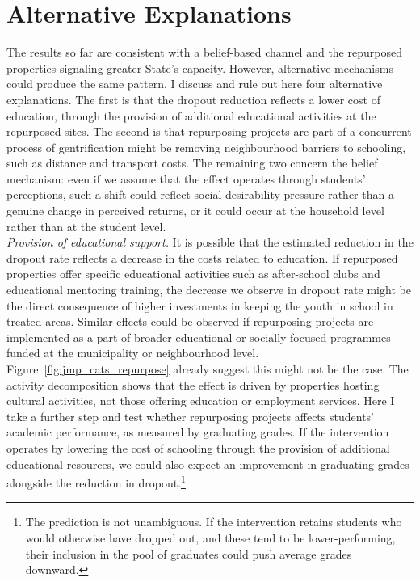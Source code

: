 \documentclass[12pt]{article}
\theoremstyle{plain}
\theoremstyle{plain}
\theoremstyle{plain}
\theoremstyle{definition}
\theoremstyle{plain}
\theoremstyle{definition}
\theoremstyle{plain}
\theoremstyle{remark}
\theoremstyle{definition}
\theoremstyle{definition}
\theoremstyle{plain}
\begin{document}
\section{Alternative Explanations}
\label{sec:jmp_altexpl}
The results so far are consistent with a belief-based channel and the repurposed properties signaling greater State's capacity. However, alternative mechanisms could produce the same pattern. I discuss and rule out here four alternative explanations. The first is that the dropout reduction reflects a lower cost of education, through the provision of additional educational activities at the repurposed sites. The second is that repurposing projects are part of a concurrent process of gentrification might be removing neighbourhood barriers to schooling, such as distance and transport costs. The remaining two concern the belief mechanism: even if we assume that the effect operates through students' perceptions, such a shift could reflect social-desirability pressure rather than a genuine change in perceived returns, or it could occur at the household level rather than at the student level. \\
\emph{Provision of educational support.} It is possible that the estimated reduction in the dropout rate reflects a decrease in the costs related to education. If repurposed properties offer specific educational activities such as after-school clubs and educational mentoring training, the decrease we observe in dropout rate might be the direct consequence of higher investments in keeping the youth in school in treated areas. Similar effects could be observed if repurposing projects are implemented as a part of broader educational or socially-focused programmes funded at the municipality or neighbourhood level. Figure~\ref{fig:jmp_cats_repurpose} already suggest this might not be the case. The activity decomposition shows that the effect is driven by properties hosting cultural activities, not those offering education or employment services. Here I take a further step and test whether repurposing projects affects students' academic performance, as measured by graduating grades. If the intervention operates by lowering the cost of schooling through the provision of additional educational resources, we could also expect an improvement in graduating grades alongside the reduction in dropout.\footnote{The prediction is not unambiguous. If the intervention retains students who would otherwise have dropped out, and these tend to be lower-performing, their inclusion in the pool of graduates could push average grades downward.} 
\end{document}
